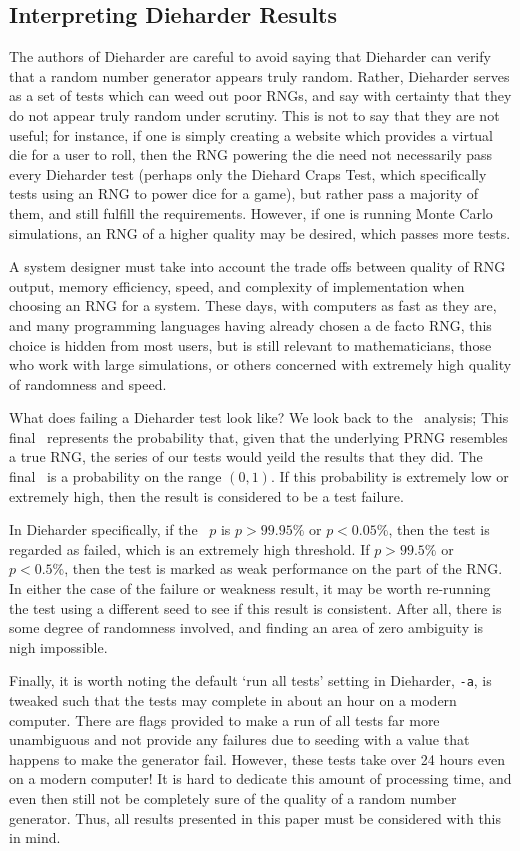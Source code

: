 \subsection{Interpreting Dieharder Results}
The authors of Dieharder are careful to avoid saying that Dieharder can verify that a random number generator appears truly random. Rather, Dieharder serves as a set of tests which can weed out poor RNGs, and say with certainty that they do not appear truly random under scrutiny. This is not to say that they are not useful; for instance, if one is simply creating a website which provides a virtual die for a user to roll, then the RNG powering the die need not necessarily pass every Dieharder test (perhaps only the Diehard Craps Test, which specifically tests using an RNG to power dice for a game), but rather pass a majority of them, and still fulfill the requirements. However, if one is running Monte Carlo simulations, an RNG of a higher quality may be desired, which passes more tests.

A system designer must take into account the trade offs between quality of RNG output, memory efficiency, speed, and complexity of implementation when choosing an RNG for a system. These days, with computers as fast as they are, and many programming languages having already chosen a de facto RNG, this choice is hidden from most users, but is still relevant to mathematicians, those who work with large simulations, or others concerned with extremely high quality of randomness and speed.

What does failing a Dieharder test look like? We look back to the \pvalue~analysis; This final \pvalue~represents the probability that, given that the underlying PRNG resembles a true RNG, the series of our tests would yeild the results that they did. The final \pvalue~is a probability on the range $(0,1)$. If this probability is extremely low or extremely high, then the result is considered to be a test failure.

In Dieharder specifically, if the \pvalue~$p$ is $p > 99.95 \%$ or $p < 0.05 \%$, then the test is regarded as failed, which is an extremely high threshold. If $p > 99.5 \%$ or $p < 0.5 \%$, then the test is marked as weak performance on the part of the RNG. In either the case of the failure or weakness result, it may be worth re-running the test using a different seed to see if this result is consistent. After all, there is some degree of randomness involved, and finding an area of zero ambiguity is nigh impossible.

Finally, it is worth noting the default `run all tests' setting in Dieharder, \texttt{-a}, is tweaked such that the tests may complete in about an hour on a modern computer. There are flags provided to make a run of all tests far more unambiguous and not provide any failures due to seeding with a value that happens to make the generator fail. However, these tests take over 24 hours even on a modern computer! It is hard to dedicate this amount of processing time, and even then still not be completely sure of the quality of a random number generator. Thus, all results presented in this paper must be considered with this in mind.

